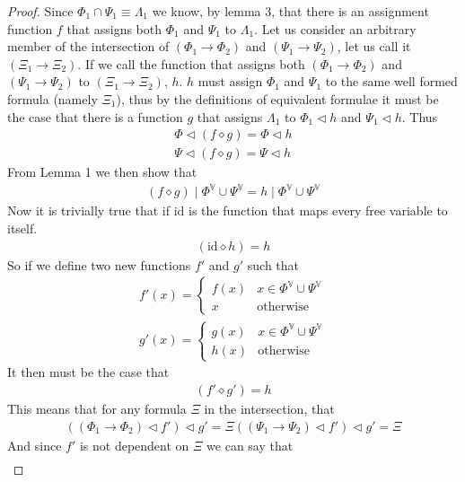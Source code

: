 \documentclass{article}
\begin{document}
\begin{proof}
Since $\Phi_1\cap \Psi_1 \equiv \Lambda_1$ we know, by lemma 3, that there is an assignment function $f$ that assigns both $\Phi_1$ and $\Psi_1$ to $\Lambda_1$.
Let us consider an arbitrary member of the intersection of $(\Phi_1\rightarrow\Phi_2)$ and $(\Psi_1\rightarrow\Psi_2)$, let us call it $(\Xi_1\rightarrow\Xi_2)$.
If we call the function that assigns both $(\Phi_1\rightarrow\Phi_2)$ and $(\Psi_1\rightarrow\Psi_2)$ to $(\Xi_1\rightarrow\Xi_2)$, $h$.
$h$ must assign $\Phi_1$ and $\Psi_1$ to the same well formed formula (namely $\Xi_1$),
thus by the definitions of equivalent formulae it must be the case that there is a function $g$ that assigns $\Lambda_1$ to $\Phi_1\lhd h$ and $\Psi_1\lhd h$.
Thus
\begin{align*}
\Phi \lhd (f\diamond g) = \Phi \lhd h \\
\Psi \lhd (f\diamond g) = \Psi \lhd h
\end{align*}
From Lemma 1 we then show that
\begin{align*}
(f\diamond g) \mid \Phi^\mathbb{V} \cup \Psi^\mathbb{V} = h \mid \Phi^\mathbb{V} \cup \Psi^\mathbb{V} 
\end{align*}
Now it is trivially true that if $\mathrm{id}$ is the function that maps every free variable to itself.
\begin{align*}
(\mathrm{id}\diamond h) = h
\end{align*}
So if we define two new functions $f'$ and $g'$ such that
\begin{align*}
f' (x) = \begin{cases}
f (x) & x \in \Phi^\mathbb{V} \cup \Psi^\mathbb{V} \\ 
x & \mathrm{otherwise}
\end{cases}\\
g'(x) = \begin{cases}
g (x) & x \in \Phi^\mathbb{V} \cup \Psi^\mathbb{V} \\ 
h (x) & \mathrm{otherwise}
\end{cases}
\end{align*}
It then must be the case that
\begin{align*}
(f'\diamond g') = h
\end{align*}
This means that for any formula $\Xi$ in the intersection, that
\begin{align*}
((\Phi_1\rightarrow\Phi_2)\lhd f')\lhd g' = \Xi
((\Psi_1\rightarrow\Psi_2)\lhd f')\lhd g' = \Xi
\end{align*}
And since $f'$ is not dependent on $\Xi$ we can say that
\begin{align*}

\end{align*}
\end{proof}
\end{document}
